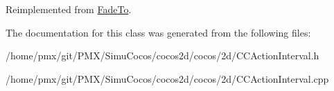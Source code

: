 Reimplemented from \hyperlink{classFadeTo_a7846758ff3760d099ca70c279c52bde0}{Fade\+To}.



The documentation for this class was generated from the following files\+:\begin{DoxyCompactItemize}
\item 
/home/pmx/git/\+P\+M\+X/\+Simu\+Cocos/cocos2d/cocos/2d/C\+C\+Action\+Interval.\+h\item 
/home/pmx/git/\+P\+M\+X/\+Simu\+Cocos/cocos2d/cocos/2d/C\+C\+Action\+Interval.\+cpp\end{DoxyCompactItemize}
